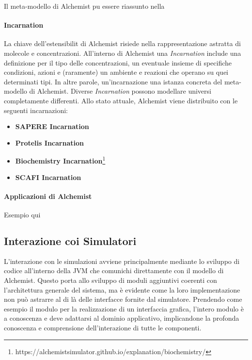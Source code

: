 Il meta-modello di Alchemist pu essere riassunto nella 


\paragraph{Incarnation}\label{}
La chiave dell'estensibilit di Alchemist risiede nella rappresentazione astratta di molecole e concentrazioni.
All'interno di Alchemist una \textit{Incarnation} include una definizione per il tipo delle concentrazioni, un eventuale insieme di specifiche
condizioni, azioni e (raramente) un ambiente e reazioni che operano su quei determinati tipi. In altre parole, un'incarnazione  una
istanza concreta del meta-modello di Alchemist.
%
Diverse \textit{Incarnation} possono modellare universi completamente differenti. Allo stato attuale, Alchemist viene distribuito con le seguenti incarnazioni:
\begin{itemize}
    \item \textbf{SAPERE Incarnation}~\cite{sapere}
    \item \textbf{Protelis Incarnation}~\cite{protelis}
    \item \textbf{Biochemistry Incarnation}\footnote{https://alchemistsimulator.github.io/explanation/biochemistry/}
    \item \textbf{SCAFI Incarnation}~\cite{CASADEI2022101248}
\end{itemize}

\paragraph{Applicazioni di Alchemist}
Esempio qui

\subsection{Interazione coi Simulatori}\label{ssec:sim-interactions}
L'interazione con le simulazioni avviene principalmente mediante lo sviluppo di codice all'interno della \ac{JVM} che comunichi direttamente con il modello di Alchemist.
Questo porta allo sviluppo di moduli aggiuntivi coerenti con l'architettura generale del sistema, ma è evidente come la loro implementazione non può astrarre al di là delle interfacce fornite
dal simulatore. Prendendo come esempio il modulo per la realizzazione di un interfaccia grafica, l'intero modulo è a conoscenza e deve adattarsi al dominio applicativo, implicandone 
la profonda conoscenza e comprensione dell'interazione di tutte le componenti.

